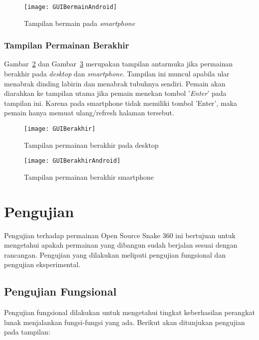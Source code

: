 \begin{figure}[H]
	\centering  
	\texttt{[image: GUIBermainAndroid]}  
	\caption[Tampilan bermain pada \textit{smartphone}]{Tampilan bermain pada \textit{smartphone}}
	\label{fig:GUIBermainAndroid} 
\end{figure}

\subsubsection{Tampilan Permainan Berakhir}
Gambar~\ref{fig:GUIBerakhir} dan Gambar~\ref{fig:GUIBerakhirAndroid} merupakan tampilan antarmuka jika permainan berakhir pada \textit{desktop} dan \textit{smartphone}. Tampilan ini muncul apabila ular menabrak dinding labirin dan menabrak tubuhnya sendiri. Pemain akan diarahkan ke tampilan utama jika pemain menekan tombol '\textit{Enter}' pada tampilan ini. Karena pada smartphone tidak memiliki tombol 'Enter', maka pemain hanya memuat ulang/refresh halaman tersebut.

\begin{figure}[H]
	\centering  
	\texttt{[image: GUIBerakhir]}  
	\caption[Tampilan permainan berakhir pada desktop]{Tampilan permainan berakhir pada desktop}
	\label{fig:GUIBerakhir} 
\end{figure}

\begin{figure}[H]
	\centering  
	\texttt{[image: GUIBerakhirAndroid]}  
	\caption[Tampilan permainan berakhir pada smartphone]{Tampilan permainan berakhir smartphone}
	\label{fig:GUIBerakhirAndroid} 
\end{figure}

\section{Pengujian}
Pengujian terhadap permainan Open Source Snake 360 ini bertujuan untuk mengetahui apakah permainan yang dibangun sudah berjalan sesuai dengan rancangan. Pengujian yang dilakukan meliputi pengujian fungsional dan pengujian eksperimental. 

\subsection{Pengujian Fungsional}
Pengujian fungsional dilakukan untuk mengetahui tingkat keberhasilan perangkat lunak menjalankan fungsi-fungsi yang ada. Berikut akan ditunjukan pengujian pada tampilan: 

